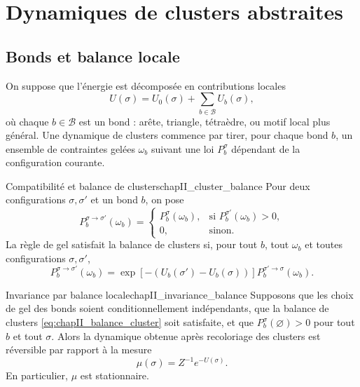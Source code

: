 \section{Dynamiques de clusters abstraites}
\label{sec:chapII_cluster_abstrait}

\subsection{Bonds et balance locale}

On suppose que l'énergie est décomposée en contributions locales
\begin{equation}
    U(\sigma)=U_0(\sigma)+\sum_{b\in\mathcal B}U_b(\sigma),
    \label{eq:chapII_bond_decomposition}
\end{equation}
où chaque $b\in\mathcal B$ est un bond : arête, triangle, tétraèdre, ou motif local plus général. Une dynamique de clusters commence par tirer, pour chaque bond $b$, un ensemble de contraintes gelées $\omega_b$ suivant une loi $P_b^\sigma$ dépendant de la configuration courante.

\begin{Definition}{Compatibilité et balance de clusters}{chapII_cluster_balance}
Pour deux configurations $\sigma,\sigma'$ et un bond $b$, on pose
\begin{equation}
    P_b^{\sigma\to\sigma'}(\omega_b)
    =
    \begin{cases}
        P_b^\sigma(\omega_b),&\text{si }P_b^{\sigma'}(\omega_b)>0,\\
        0,&\text{sinon.}
    \end{cases}
    \label{eq:chapII_compatibilite}
\end{equation}
La règle de gel satisfait la balance de clusters si, pour tout $b$, tout $\omega_b$ et toutes configurations $\sigma,\sigma'$,
\begin{equation}
    P_b^{\sigma\to\sigma'}(\omega_b)
    =
    \exp\left[-\left(U_b(\sigma')-U_b(\sigma)\right)\right]
    P_b^{\sigma'\to\sigma}(\omega_b).
    \label{eq:chapII_balance_cluster}
\end{equation}
\end{Definition}

\begin{Theoreme}{Invariance par balance locale}{chapII_invariance_balance}
Supposons que les choix de gel des bonds soient conditionnellement indépendants, que la balance de clusters \eqref{eq:chapII_balance_cluster} soit satisfaite, et que $P_b^\sigma(\varnothing)>0$ pour tout $b$ et tout $\sigma$. Alors la dynamique obtenue après recoloriage des clusters est réversible par rapport à la mesure
\[
    \mu(\sigma)=Z^{-1}e^{-U(\sigma)}.
\]
En particulier, $\mu$ est stationnaire.
\end{Theoreme}

